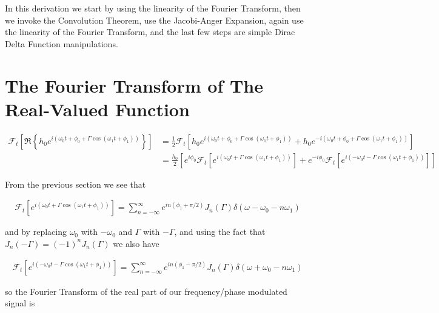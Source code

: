 \documentclass[onecolumn, groupedaddress, 10pt]{revtex4-1}
\begin{document}
In this derivation we start by using the linearity of the Fourier Transform, then we invoke the Convolution Theorem, use the Jacobi-Anger Expansion, again use the linearity of the Fourier Transform, and the last few steps are simple Dirac Delta Function manipulations.

\section{The Fourier Transform of The Real-Valued Function}

\begin{align}
\mathcal{F}_t \left[ \Re \left\{ h_0 e^{i\left( \omega_0 t + \phi_0 + \Gamma \cos( \omega_1 t + \phi_1 ) \right)} \right\} \right]
&= \frac{1}{2} \mathcal{F}_t \left[ h_0 e^{i\left( \omega_0 t + \phi_0 + \Gamma \cos( \omega_1 t + \phi_1 ) \right)} 
                        + h_0 e^{-i\left( \omega_0 t + \phi_0 + \Gamma \cos( \omega_1 t + \phi_1 ) \right)} \right]			\\
&= \frac{h_0}{2} \left[ 
  e^{ i\phi_0} \mathcal{F}_t \left[ e^{i\left(  \omega_0 t + \Gamma \cos( \omega_1 t + \phi_1 ) \right)} \right] 
+ e^{-i\phi_0} \mathcal{F}_t \left[ e^{i\left( -\omega_0 t - \Gamma \cos( \omega_1 t + \phi_1 ) \right)} \right] 
\right]
\end{align}

From the previous section we see that

\begin{align}
\mathcal{F}_t \left[ e^{i(\omega_0 t + \Gamma \cos(\omega_1 t + \phi_1))} \right] 
= \sum_{n=-\infty}^{\infty} e^{in(\phi_1 + \pi/2)} J_n(\Gamma)  \delta(\omega - \omega_0 - n\omega_1)
\end{align}

and by replacing $\omega_0$ with $-\omega_0$ and $\Gamma$ with $-\Gamma$, and using the fact that $J_n(-\Gamma) = (-1)^n J_n (\Gamma)$ we also have

\begin{align}
\mathcal{F}_t \left[ e^{i(-\omega_0 t - \Gamma \cos(\omega_1 t + \phi_1))} \right] 
= \sum_{n=-\infty}^{\infty} e^{in(\phi_1 - \pi/2)} J_n(\Gamma)  \delta(\omega + \omega_0 - n\omega_1)
\end{align}

so the Fourier Transform of the real part of our frequency/phase modulated signal is
\end{document}

